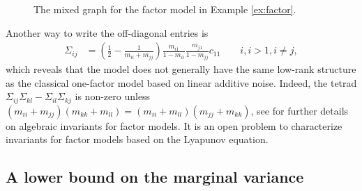 \documentclass[10pt,twoside,a4paper]{amsart}
\begin{document}
\begin{ex}
\begin{figure}
\begin{tikzpicture}
   
    \end{tikzpicture} 
    \caption{The mixed graph for the factor model in Example \ref{ex:factor}. 
        \label{fig:graph2}}
\end{figure}

Another way to write the off-diagonal entries is
\begin{align} 
    \label{eq:factor_off2}
    \Sigma_{ij} & = \left(\frac{1}{2} - \frac{1}{m_{ii} + m_{jj}}\right) 
    \frac{m_{i1}}{1 - m_{ii}} \frac{m_{j1}}{1 - m_{jj}} c_{11} \qquad i, i > 1, i \neq j,
\end{align}
which reveals that the model does not generally have the same low-rank structure as 
the classical one-factor model based on linear additive noise. Indeed, the 
tetrad $\Sigma_{ij} \Sigma_{kl} - \Sigma_{il}\Sigma_{kj}$ is non-zero 
unless $(m_{ii} + m_{jj})(m_{kk} + m_{ll}) = (m_{ii} + m_{ll})(m_{jj} + m_{kk})$,
see \cite{Drton:2007aa,drton2024} for further details on algebraic invariants 
for factor models. It is an open problem to characterize invariants for factor 
models based on the Lyapunov equation.
\end{ex}

\subsection{A lower bound on the marginal variance} 
\end{document}
